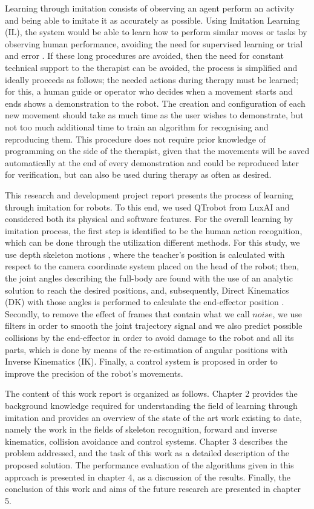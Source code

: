 \documentclass[thesis]{mas_proposal}
\begin{document}
\begin{itemize}
    Learning through imitation consists of observing an agent perform an activity and being able to imitate it as accurately as possible. Using Imitation Learning (IL), the system would be able to learn how to perform similar moves or tasks by observing human performance, avoiding the need for supervised learning or trial and error \cite{lopes2005developmental}. If these long procedures are avoided, then the need for constant technical support to the therapist can be avoided, the process is simplified and ideally proceeds as follows; the needed actions during therapy must be learned; for this, a human guide or operator who decides when a movement starts and ends shows a demonstration to the robot. The creation and configuration of each new movement should take as much time as the user wishes to demonstrate, but not too much additional time to train an algorithm for recognising and reproducing them. This procedure does not require prior knowledge of programming on the side of the therapist, given that the movements will be saved automatically at the end of every demonstration and could be reproduced later for verification, but can also be used during therapy as often as desired.
    
    This research and development project report presents the process of learning through imitation for robots. To this end, we used QTrobot from LuxAI \cite{qtrobot_safety_manual} and considered both its physical and software features. For the overall learning by imitation process, the first step is identified to be the human action recognition, which can be done through the utilization different methods. For this study, we use depth skeleton motions \cite{Chen_2016}, where the teacher's position is calculated with respect to the camera coordinate system placed on the head of the robot; then, the joint angles describing the full-body are found with the use of an analytic solution to reach the desired positions, and, subsequently, Direct Kinematics (DK) with those angles is performed to calculate the end-effector position \cite{Riley}. Secondly, to remove the effect of frames that contain what we call $noise$, we use filters in order to smooth the joint trajectory signal and we also predict possible collisions by the end-effector in order to avoid damage to the robot and all its parts, which is done by means of the re-estimation of angular positions with Inverse Kinematics (IK). Finally, a control system is proposed in order to improve the precision of the robot's movements.
    
    The content of this work report is organized as follows. Chapter 2 provides the background knowledge required for understanding the field of learning through imitation and provides an overview of the state of the art work existing to date, namely the work in the fields of skeleton recognition, forward and inverse kinematics, collision avoidance and control systems. Chapter 3 describes the problem addressed, and the task of this work as a detailed description of the proposed solution. The performance evaluation of the algorithms given in this approach is presented in chapter 4, as a discussion of the results. Finally, the conclusion of this work and aims of the future research are presented in chapter 5.
    

\end{itemize}
\end{document}
